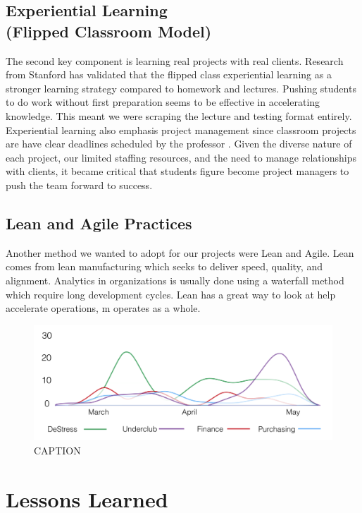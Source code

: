 \documentclass{sig-alternate}
\begin{document}
\subsection{Experiential Learning \\(Flipped Classroom Model)}

The second key component is learning real projects with real clients. Research from Stanford \cite{plotnikoff_classes_2013} has validated that the flipped class experiential learning as a stronger learning strategy compared to homework and lectures. Pushing students to do work without first preparation seems to be effective in accelerating knowledge. This meant we were scraping the lecture and testing format entirely. Experiential learning also emphasis project management since classroom projects are have clear deadlines scheduled by the professor \cite{mok2014teaching}. Given the diverse nature of each project, our limited staffing resources, and the need to manage relationships with clients, it became critical that students figure become project managers to push the team forward to success.

\subsection{Lean and Agile Practices}

Another method we wanted to adopt for our projects were Lean and Agile. Lean comes from lean manufacturing which seeks to deliver speed, quality, and alignment. Analytics in organizations is usually done using a waterfall method which require long development cycles. Lean has a great way to look at help accelerate operations, m operates as a whole.

\begin{figure}
\centerline{\includegraphics[scale=0.3]{dsc_figure_gitcommits.png}}
\caption{CAPTION}
\end{figure}


\section{Lessons Learned}
\end{document}
